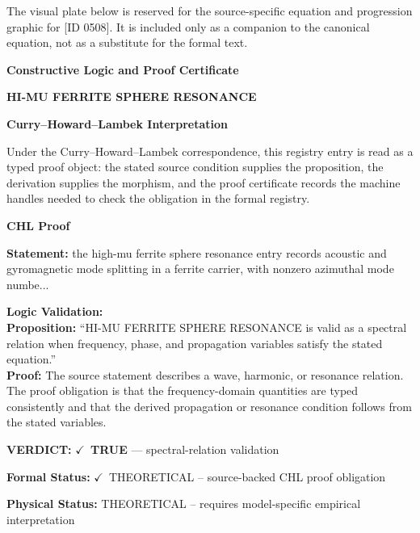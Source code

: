 \begingroup\footnotesize\sloppy
The visual plate below is reserved for the source-specific equation and progression graphic for [ID 0508]. It is included only as a companion to the canonical equation, not as a substitute for the formal text.
\par\endgroup
\ifTZPDarkEdition
{}
\fi

\clearpage
\begingroup\tzpsupportsetup
\noindent\textbf{\fontsize{10.8pt}{12.8pt}\selectfont [ID 0508] Constructive Logic and Proof Certificate}\par
\noindent\textbf{\fontsize{10pt}{12pt}\selectfont HI-MU FERRITE SPHERE RESONANCE}\par
\vspace{0.45em}
\begingroup
\footnotesize
\setlength{\parskip}{0.22em}
\setlength{\parindent}{0pt}
\noindent\textbf{Curry--Howard--Lambek Interpretation}\par
Under the Curry--Howard--Lambek correspondence, this registry entry is read as a typed proof
object: the stated source condition supplies the proposition, the derivation supplies the
morphism, and the proof certificate records the machine handles needed to check the obligation
in the formal registry.

\vspace{0.45em}
\noindent\textbf{CHL Proof}\par
\textbf{Statement:} the high-mu ferrite sphere resonance entry records acoustic and gyromagnetic mode
splitting in a ferrite carrier, with nonzero azimuthal mode numbe...

\textbf{Logic Validation:}\\
\textbf{Proposition:} ``HI-MU FERRITE SPHERE RESONANCE is valid as a spectral relation when frequency, phase,
and propagation variables satisfy the stated equation.''\\
\textbf{Proof:} The source statement describes a wave, harmonic, or resonance relation. The proof
obligation is that the frequency-domain quantities are typed consistently and that the
derived propagation or resonance condition follows from the stated variables.

\textbf{VERDICT:} \ensuremath{\checkmark}\ \textbf{TRUE} --- spectral-relation validation

\textbf{Formal Status:} \ensuremath{\checkmark}\ THEORETICAL -- source-backed CHL proof obligation

\textbf{Physical Status:} THEORETICAL -- requires model-specific empirical interpretation
\par\vspace{0.45em}
\par
\ifTZPDarkEdition
{}
\fi
\endgroup
\endgroup
